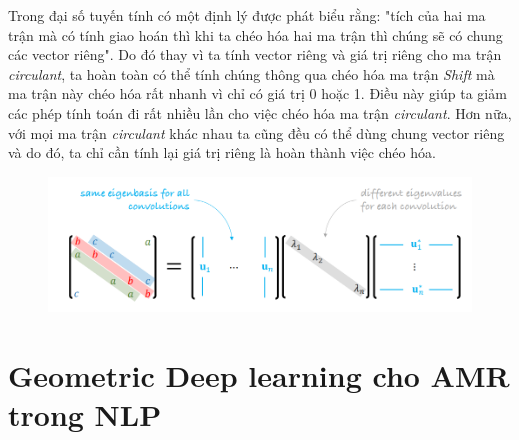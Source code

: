 Trong đại số tuyến tính có một định lý được phát biểu rằng: "tích của hai ma trận mà có tính giao hoán thì khi ta chéo hóa hai ma trận thì chúng sẽ có chung các vector riêng". Do đó thay vì ta tính vector riêng và giá trị riêng cho ma trận \textit{circulant}, ta hoàn toàn có thể tính chúng thông qua chéo hóa ma trận \textit{Shift} mà ma trận này chéo hóa rất nhanh vì chỉ có giá trị 0 hoặc 1. Điều này giúp ta giảm các phép tính toán đi rất nhiều lần cho việc chéo hóa ma trận \textit{circulant}. Hơn nữa, với mọi ma trận \textit{circulant} khác nhau ta cũng đều có thể dùng chung vector riêng và do đó, ta chỉ cần tính lại giá trị riêng là hoàn thành việc chéo hóa.

\begin{figure}[H]
    \centering
    \includegraphics[width=1\linewidth]{Images/GDL/grid_conv/convolution_diagon.png}
\end{figure}





\section{Geometric Deep learning cho AMR trong NLP}


% 